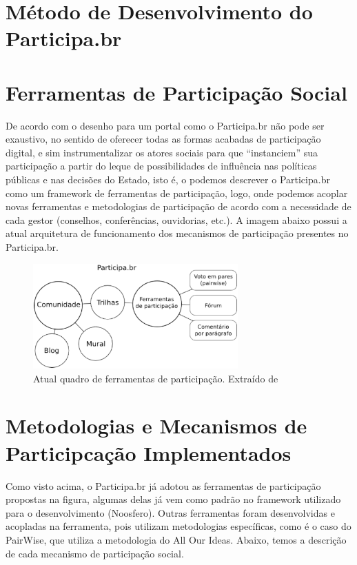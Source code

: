\section{Método de Desenvolvimento do Participa.br}

\section{Ferramentas de Participação Social}

De acordo com \cite{solagna2014metodologias} o desenho para um portal como o Participa.br não pode ser exaustivo, no sentido de oferecer todas as formas acabadas de participação digital, e sim instrumentalizar os atores sociais para que “instanciem” sua participação a partir do leque de possibilidades de influência nas políticas públicas e nas decisões do Estado, isto é, o podemos descrever o Participa.br como um framework de ferramentas de participação, logo, onde podemos acoplar novas ferramentas e metodologias de participação de acordo com a necessidade de cada gestor (conselhos, conferências, ouvidorias, etc.).
%
A imagem abaixo possui a atual arquitetura de funcionamento dos mecanismos de participação presentes no Participa.br. 

\graphicspath{{figuras/}}
\begin{figure}[H]
\centering
\includegraphics[width=0.7\textwidth]{arquitetura-ferramentas-participa}
\caption{Atual quadro de ferramentas de participação. Extraído de \cite{solagna2014metodologias}}
\label{fig:rails-architecture}
\end{figure}

\section{Metodologias e Mecanismos de Participcação Implementados}

Como visto acima, o Participa.br já adotou as ferramentas de participação propostas na figura, algumas delas já vem como padrão no framework utilizado para o desenvolvimento (Noosfero). Outras ferramentas foram desenvolvidas e acopladas na ferramenta, pois utilizam metodologias específicas, como é o caso do PairWise, que utiliza a metodologia do All Our Ideas. Abaixo, temos a descrição de cada mecanismo de participação social.


